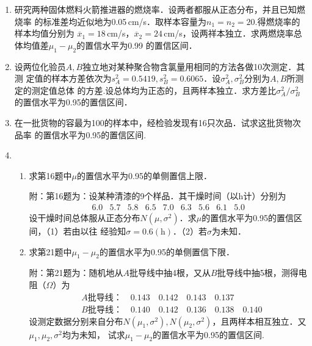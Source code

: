 \documentclass[10pt,a4paper]{article}
\begin{document}
\begin{enumerate}
    \item 研究两种固体燃料火箭推进器的燃烧率．设两者都服从正态分布，并且已知燃烧率
    的标准差均近似地为0.05$\, $cm/s．取样本容量为$n_1=n_2=20$.得燃烧率的样本均值分别为
    $\overline{x}_1=18\, $cm/s，$\overline{x}_2=24\, $cm/s，设两祥本独立．求两燃烧率总体均值差$\mu_1-\mu_2$的置信水平为0.99
    的置信区间．
    \clearpage



    \item 设两位化验员$A, B$独立地对某种聚合物含氯量用相同的方法各做10次测定．其测
    定值的样本方差依次为$s_A^2=0.5419,s_B^2=0.6065$．设$\sigma_A^2,\sigma_B^2$分别为$A,B$所测定的测定值总体
    的方差.设总体均为正态的，且两样本独立．求方差比$\sigma_A^2/\sigma_B^2$的置信水平为0.95的置信区间．
    \clearpage

    \item 在一批货物的容最为100的样本中，经检验发现有16只次品．试求这批货物次品率
    的置信水平为0.95的置信区间.
    \clearpage



    \item \begin{enumerate}
        \item 求第16题中$\mu$的置信水平为0.95的单侧置信上限．
        
        {\kaishu 附：第16题为：设某种清漆的9个样品．其干燥时间（以h计）分别为
        $$\begin{array}{ccccccccc}
            6.0 & 5.7 & 5.8 & 6.5 & 7.0 & 6.3 & 5.6 & 6.1 & 5.0
        \end{array}$$
        设干燥时间总体服从正态分布$N(\mu,\sigma^2)$．求$\mu$的置信水平为0.95的置信区间，（1）若由以往
        经验知$\sigma=0.6(\mathrm{h})$．（2）若$\sigma$为未知．}

        \item 求第21题中$\mu_1-\mu_2$的置信水平为0.95的单侧置信下限．
        
        {\kaishu 附：第21题为：随机地从$A$批导线中抽4根，又从$B$批导线中抽5根，测得电阻（$\Omega$）为
        \begin{equation}
            \begin{split}
                & A\mbox{批导线：} \quad  0.143 \quad 0.142 \quad 0.143 \quad 0.137\\
                & B\mbox{批导线：} \quad  0.140 \quad 0.142 \quad 0.136 \quad 0.138 \quad 0.140
            \end{split}
            \nonumber
        \end{equation}
        设测定数据分别来自分布$N(\mu_1,\sigma^2),N(\mu_2,\sigma^2)$，且两样本相互独立．又$\mu_1,\mu_2,\sigma^2$均为未知，
        试求$\mu_1-\mu_2$的置信水平为0.95的置信区间.}


\end{enumerate}
\end{enumerate}
\end{document}
